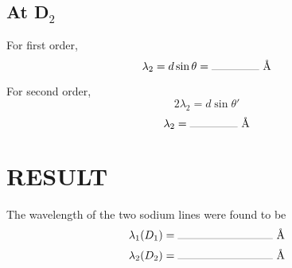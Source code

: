 \documentclass[12pt,a4paper]{article}
\begin{document}
				\subsection{At D$_{2}$}
					For first order,
					$$\lambda_{2}=d\sin\theta=\rule{10ex}{0.2pt}\text{ \AA}$$
					
					For second order,
					$$2\lambda_{2}=d\sin\theta'$$
					$$\lambda_{2}=\rule{10ex}{0.2pt}\text{ \AA}$$
			
			\section{RESULT}
			The wavelength of the two sodium lines were found to be \\
			$$\lambda_{1} (D_{1}) = \rule{20ex}{0.2pt}\text{ \AA}$$
			$$\lambda_{2} (D_{2}) = \rule{20ex}{0.2pt}\text{ \AA}$$
\end{document}
